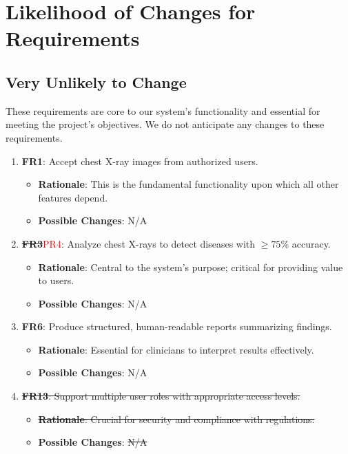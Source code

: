 \documentclass[12pt]{article}
\begin{document}
  
\clearpage
\section{Likelihood of Changes for Requirements}

\subsection{Very Unlikely to Change}

These requirements are core to our system's functionality and essential for meeting the project's objectives. We do not anticipate any changes to these requirements.

\begin{enumerate}
    \item \textbf{FR1}: Accept chest X-ray images from authorized users.
    \begin{itemize}[label=-]
        \item \textbf{Rationale}: This is the fundamental functionality upon which all other features depend.
        \item \textbf{Possible Changes}: N/A
    \end{itemize}

    \item \sout{\textbf{FR3}}\textcolor{red}{PR4}: Analyze chest X-rays to detect diseases with $\geq75\%$ accuracy.
    \begin{itemize}[label=-]
        \item \textbf{Rationale}: Central to the system's purpose; critical for providing value to users.
        \item \textbf{Possible Changes}: N/A
    \end{itemize}

    \item \textbf{FR6}: Produce structured, human-readable reports summarizing findings.
    \begin{itemize}[label=-]
        \item \textbf{Rationale}: Essential for clinicians to interpret results effectively.
        \item \textbf{Possible Changes}: N/A
    \end{itemize}

    \item \sout{\textbf{FR13}: Support multiple user roles with appropriate access levels.}
    \begin{itemize}[label=-]
        \item \sout{\textbf{Rationale}: Crucial for security and compliance with regulations.}
        \item \textbf{Possible Changes}: \sout{N/A}
    \end{itemize}


\end{enumerate}
\end{document}
